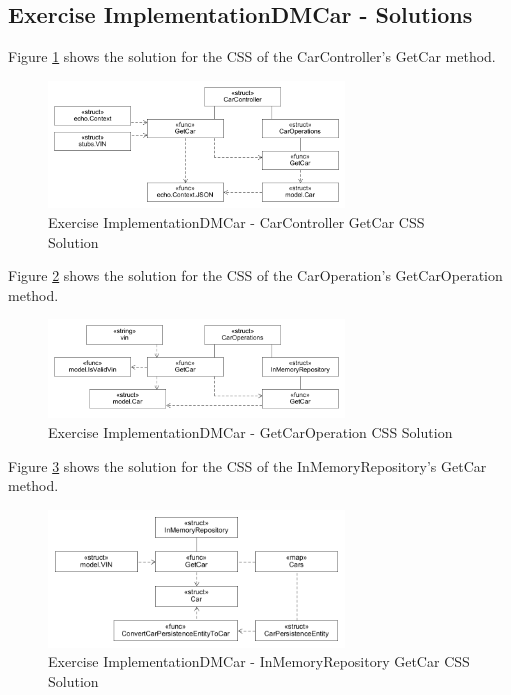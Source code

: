 \subsection*{Exercise ImplementationDMCar - Solutions}

Figure \ref{fig:m2go_carcontroller_getcar_css} shows the solution for the CSS of the CarController's GetCar method.

\begin{figure}[tb]
	\centering
	\includegraphics[width=0.7\textwidth]{figures/8.15_m2go_carcontroller_getcar_css.png}
	\caption{Exercise ImplementationDMCar - CarController GetCar CSS Solution}
	\label{fig:m2go_carcontroller_getcar_css}
\end{figure}

Figure \ref{fig:m2go_caroperations_getcar_css} shows the solution for the CSS of the CarOperation's GetCarOperation method.

\begin{figure}[tb]
	\centering
	\includegraphics[width=0.7\textwidth]{figures/8.16_m2go_caroperations_getcar_css.png}
	\caption{Exercise ImplementationDMCar - GetCarOperation CSS Solution}
	\label{fig:m2go_caroperations_getcar_css}
\end{figure}

Figure \ref{fig:m2go_inmemoryrepository_getcar_css} shows the solution for the CSS of the InMemoryRepository's GetCar method.

\begin{figure}[tb]
	\centering
	\includegraphics[width=0.7\textwidth]{figures/8.17_m2go_inmemoryrepository_getcar_css.png}
	\caption{Exercise ImplementationDMCar - InMemoryRepository GetCar CSS Solution}
	\label{fig:m2go_inmemoryrepository_getcar_css}
\end{figure}

